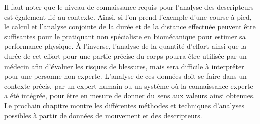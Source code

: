 Il faut noter que le niveau de connaissance requis pour l'analyse des descripteurs est également lié au contexte. Ainsi, si l'on prend l'exemple d'une course à pied, le calcul et l'analyse conjointe de la durée et de la distance effectuée peuvent être suffisantes pour le pratiquant non spécialiste en biomécanique pour estimer sa performance physique. À l'inverse, l'analyse de la quantité d'effort ainsi que la durée de cet effort pour une partie précise du corps pourra être utilisée par un médecin afin d'évaluer les risques de blessures, mais sera difficile à interpréter pour une personne non-experte. L'analyse de ces données doit se faire dans un contexte précis, par un expert humain ou un système où la connaissance experte a été intégrée, pour être en mesure de donner du sens aux valeurs ainsi obtenues. Le prochain chapitre montre les différentes méthodes et techniques d'analyses possibles à partir de données de mouvement et des descripteurs.